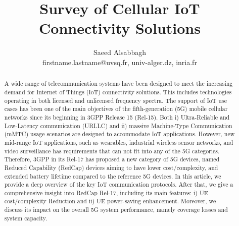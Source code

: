 \documentclass[]{IEEEtran}
\begin{document}
\title{Survey of Cellular IoT Connectivity Solutions}


\author{Saeed Alsabbagh 


firstname.lastname@uvsq.fr, univ-alger.dz, 
inria.fr
\vspace{0mm}
}


\maketitle

\begin{abstract}
A wide range of telecommunication systems have been designed to meet the increasing demand for Internet of Things (IoT) connectivity solutions.
This includes technologies operating in both licensed and unlicensed frequency spectra.
The support of IoT use cases has been one of the main objectives of the fifth-generation (5G) mobile cellular networks since its beginning in 3GPP Release 15 (Rel-15).
Both i) Ultra-Reliable and Low-Latency communication (URLLC) and ii) massive Machine-Type Communication (mMTC) usage scenarios are designed to accommodate IoT applications.
However, new mid-range IoT applications, such as wearables, industrial wireless sensor networks, and video surveillance has requirements that can not fit into any of the  5G categories.
Therefore, 3GPP in its Rel-17 has proposed a new category of 5G devices, named Reduced Capability (RedCap) devices aiming to have lower cost/complexity, and extended battery lifetime compared to the reference 5G devices.
In this article, we provide a deep overview of the key IoT communication protocols.
After that, we give a comprehensive insight into RedCap Rel-17, including its main features: i) UE cost/complexity Reduction and ii) UE power-saving enhancement.
Moreover, we discuss its impact on the overall 5G system performance, namely coverage losses and system capacity.
\end{abstract}
\end{document}
